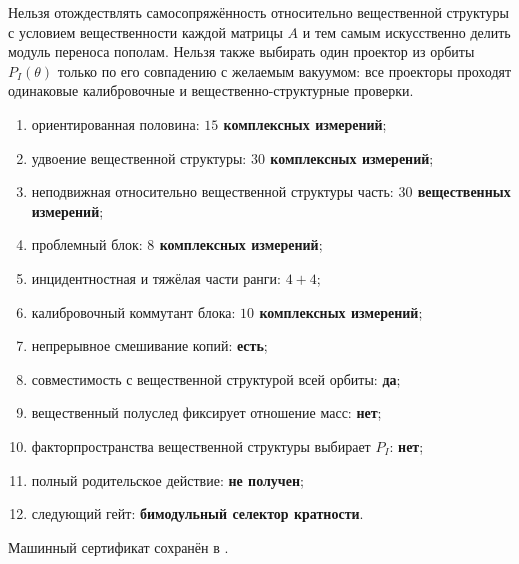 \begin{nogocriterion}
Нельзя отождествлять самосопряжённость относительно вещественной структуры с условием вещественности каждой
матрицы $A$ и тем самым искусственно делить модуль переноса пополам. Нельзя
также выбирать один проектор из орбиты $P_I(\theta)$ только по его совпадению
с желаемым вакуумом: все проекторы проходят одинаковые калибровочные и вещественно-структурные проверки.
\end{nogocriterion}

\begin{protocol}
\begin{enumerate}
 \item ориентированная половина: \textbf{$15$ комплексных измерений};
 \item удвоение вещественной структуры: \textbf{$30$ комплексных измерений};
 \item неподвижная относительно вещественной структуры часть: \textbf{$30$ вещественных измерений};
 \item проблемный блок: \textbf{$8$ комплексных измерений};
 \item инцидентностная и тяжёлая части ранги: \textbf{$4+4$};
 \item калибровочный коммутант блока: \textbf{$10$ комплексных измерений};
 \item непрерывное смешивание копий: \textbf{есть};
 \item совместимость с вещественной структурой всей орбиты: \textbf{да};
 \item вещественный полуслед фиксирует отношение масс: \textbf{нет};
 \item факторпространства вещественной структуры выбирает $P_I$: \textbf{нет};
 \item полный родительское действие: \textbf{не получен};
 \item следующий гейт: \textbf{бимодульный селектор кратности}.
\end{enumerate}
\end{protocol}

Машинный сертификат сохранён в
.